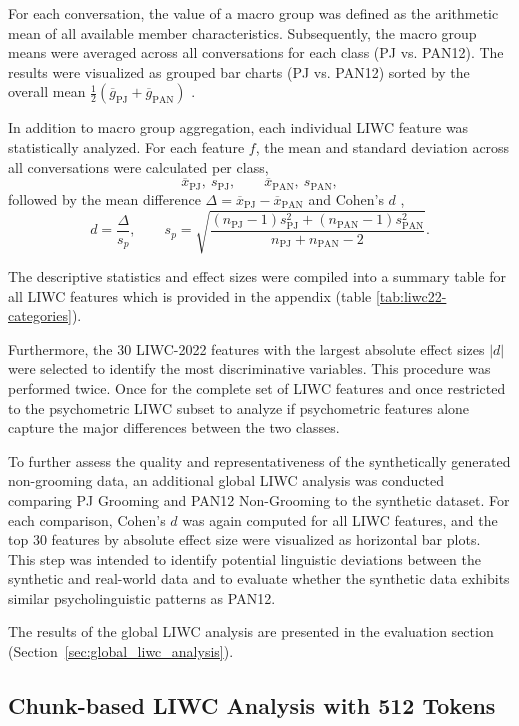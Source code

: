 For each conversation, the value of a macro group was defined as the arithmetic mean of all available member characteristics. Subsequently, the macro group means were averaged across all conversations for each class (PJ vs. PAN12). 
The results were visualized as grouped bar charts (PJ vs. PAN12) sorted by the overall mean \(\tfrac{1}{2}(\overline{g}_{\mathrm{PJ}}+\overline{g}_{\mathrm{PAN}})\) .

In addition to macro group aggregation, each individual LIWC feature was statistically analyzed. For each feature \(f\), the mean and standard deviation across all conversations were calculated per class,
\[
\overline{x}_{\mathrm{PJ}},\ s_{\mathrm{PJ}},
\qquad
\overline{x}_{\mathrm{PAN}},\ s_{\mathrm{PAN}},
\]
followed by the mean difference \(\Delta = \overline{x}_{\mathrm{PJ}} - \overline{x}_{\mathrm{PAN}}\) and Cohen's \(d\) \cite{cohen1988},
\[
d = \frac{\Delta}{s_p},
\qquad
s_p = \sqrt{\frac{(n_{\mathrm{PJ}}-1)s_{\mathrm{PJ}}^2+(n_{\mathrm{PAN}}-1)s_{\mathrm{PAN}}^2}{n_{\mathrm{PJ}}+n_{\mathrm{PAN}}-2}}.
\]


The descriptive statistics and effect sizes were compiled into a summary table for all LIWC features which is provided in the appendix (table \ref{tab:liwc22-categories}).

Furthermore, the 30 LIWC-2022 features with the largest absolute effect sizes \(|d|\) were selected to identify the most discriminative variables. 
This procedure was performed twice. Once for the complete set of LIWC features and once restricted to the psychometric LIWC subset to analyze if psychometric features alone capture the major differences between the two classes. 

To further assess the quality and representativeness of the synthetically generated non-grooming data, an additional global LIWC analysis was conducted comparing PJ Grooming and PAN12 Non-Grooming to the synthetic dataset. 
For each comparison, Cohen’s \(d\) was again computed for all LIWC features, and the top 30 features by absolute effect size were visualized as horizontal bar plots. 
This step was intended to identify potential linguistic deviations between the synthetic and real-world data and to evaluate whether the synthetic data exhibits similar psycholinguistic patterns as PAN12.

The results of the global LIWC analysis are presented in the evaluation section (Section~\ref{sec:global_liwc_analysis}).

\subsection{Chunk-based LIWC Analysis with 512 Tokens}

